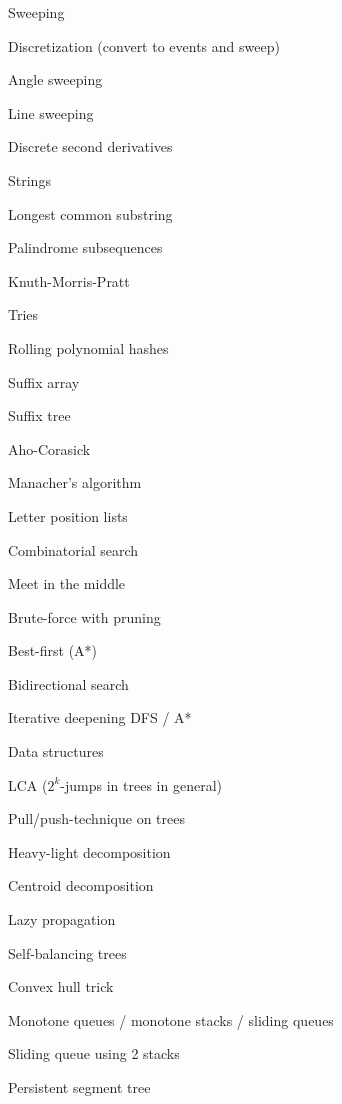 \begin{myitemize}
\begin{myitemize}
\end{myitemize}
\item Sweeping
\begin{myitemize}
	\item Discretization (convert to events and sweep)
	\item Angle sweeping
	\item Line sweeping
	\item Discrete second derivatives
\end{myitemize}
\item Strings
\begin{myitemize}
	\item Longest common substring
	\item Palindrome subsequences
	\item Knuth-Morris-Pratt
	\item Tries
	\item Rolling polynomial hashes
	\item Suffix array
	\item Suffix tree
	\item Aho-Corasick
	\item Manacher's algorithm
	\item Letter position lists
\end{myitemize}
\item Combinatorial search
\begin{myitemize}
	\item Meet in the middle
	\item Brute-force with pruning
	\item Best-first (A*)
	\item Bidirectional search
	\item Iterative deepening DFS / A*
\end{myitemize}
\item Data structures
\begin{myitemize}
	\item LCA ($2^k$-jumps in trees in general)
	\item Pull/push-technique on trees
	\item Heavy-light decomposition
	\item Centroid decomposition
	\item Lazy propagation
	\item Self-balancing trees
	\item Convex hull trick
	\item Monotone queues / monotone stacks / sliding queues
	\item Sliding queue using 2 stacks
	\item Persistent segment tree
\end{myitemize}
\end{myitemize}
